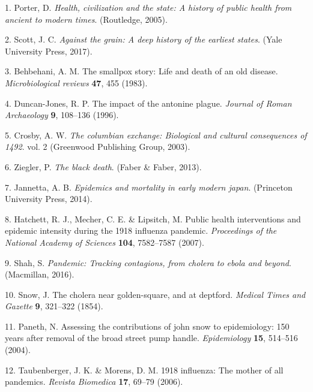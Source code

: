 \documentclass[]{article}
\begin{document}
\hypertarget{refs}{}
\leavevmode\hypertarget{ref-porter2005health}{}%
1. Porter, D. \emph{Health, civilization and the state: A history of public health from ancient to modern times}. (Routledge, 2005).

\leavevmode\hypertarget{ref-scott2017against}{}%
2. Scott, J. C. \emph{Against the grain: A deep history of the earliest states}. (Yale University Press, 2017).

\leavevmode\hypertarget{ref-behbehani1983smallpox}{}%
3. Behbehani, A. M. The smallpox story: Life and death of an old disease. \emph{Microbiological reviews} \textbf{47}, 455 (1983).

\leavevmode\hypertarget{ref-duncan1996impact}{}%
4. Duncan-Jones, R. P. The impact of the antonine plague. \emph{Journal of Roman Archaeology} \textbf{9}, 108--136 (1996).

\leavevmode\hypertarget{ref-crosby2003columbian}{}%
5. Crosby, A. W. \emph{The columbian exchange: Biological and cultural consequences of 1492}. vol. 2 (Greenwood Publishing Group, 2003).

\leavevmode\hypertarget{ref-ziegler2013black}{}%
6. Ziegler, P. \emph{The black death}. (Faber \& Faber, 2013).

\leavevmode\hypertarget{ref-jannetta2014epidemics}{}%
7. Jannetta, A. B. \emph{Epidemics and mortality in early modern japan}. (Princeton University Press, 2014).

\leavevmode\hypertarget{ref-hatchett2007public}{}%
8. Hatchett, R. J., Mecher, C. E. \& Lipsitch, M. Public health interventions and epidemic intensity during the 1918 influenza pandemic. \emph{Proceedings of the National Academy of Sciences} \textbf{104}, 7582--7587 (2007).

\leavevmode\hypertarget{ref-shah2016pandemic}{}%
9. Shah, S. \emph{Pandemic: Tracking contagions, from cholera to ebola and beyond}. (Macmillan, 2016).

\leavevmode\hypertarget{ref-snow1854cholera}{}%
10. Snow, J. The cholera near golden-square, and at deptford. \emph{Medical Times and Gazette} \textbf{9}, 321--322 (1854).

\leavevmode\hypertarget{ref-paneth2004assessing}{}%
11. Paneth, N. Assessing the contributions of john snow to epidemiology: 150 years after removal of the broad street pump handle. \emph{Epidemiology} \textbf{15}, 514--516 (2004).

\leavevmode\hypertarget{ref-taubenberger20061918}{}%
12. Taubenberger, J. K. \& Morens, D. M. 1918 influenza: The mother of all pandemics. \emph{Revista Biomedica} \textbf{17}, 69--79 (2006).
\end{document}
